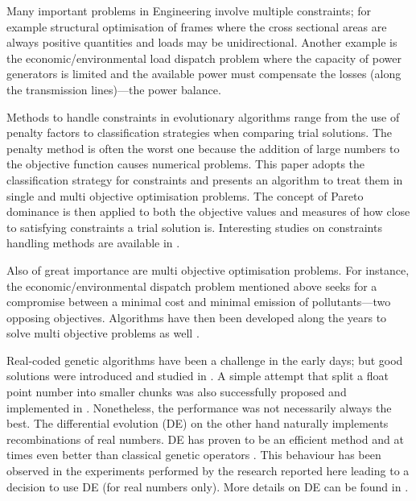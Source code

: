 \documentclass[final,5p,times,twocolumn]{elsarticle}
\begin{document}
Many important problems in Engineering involve multiple constraints; for example structural
optimisation of frames where the cross sectional areas are always positive quantities and loads may
be unidirectional. Another example is the economic/environmental load dispatch problem where the
capacity of power generators is limited and the available power must compensate the losses (along
the transmission lines)---the power balance.

Methods to handle constraints in evolutionary algorithms range from the use of penalty factors to
classification strategies when comparing trial solutions. The penalty method is often the worst one
because the addition of large numbers to the objective function causes numerical problems. This
paper adopts the classification strategy for constraints and presents an algorithm to treat them in
single and multi objective optimisation problems. The concept of Pareto dominance is then applied to
both the objective values and measures of how close to satisfying constraints a trial solution is.
Interesting studies on constraints handling methods are available in \citep{mich:94, mich:95,
mich:96, deb:00, coello:02, deb:03, vieira:04, galan:09, long:14, hellwig:16}.

Also of great importance are multi objective optimisation problems. For instance, the
economic/environmental dispatch problem mentioned above seeks for a compromise between a minimal
cost and minimal emission of pollutants---two opposing objectives. Algorithms have then been
developed along the years to solve multi objective problems as well \citep{tanaka:95, fonseca:95,
fonseca:98a, fonseca:98b, zit:00, tan:01, deb:01b, deb:02, deb:05, kukko:06b, deb:08, tiwari:08,
deb:10, tiwari:11, qiu:16}.

Real-coded genetic algorithms have been a challenge in the early days; but good solutions were
introduced and studied in \citep{deb:95a, deb:95b, mwicz:96, herrera:98}. A simple attempt that
split a float point number into smaller chunks was also successfully proposed and implemented in
\citep{pedroso:11}. Nonetheless, the performance was not necessarily always the best. The
differential evolution (DE) \citep{storn:95, price:05} on the other hand naturally implements
recombinations of real numbers. DE has proven to be an efficient method and at times even better
than classical genetic operators \citep{tiwari:11}. This behaviour has been observed in the
experiments performed by the research reported here leading to a decision to use DE (for real
numbers only). More details on DE can be found in \citep{kukko:05, kukko:06}.
\end{document}
